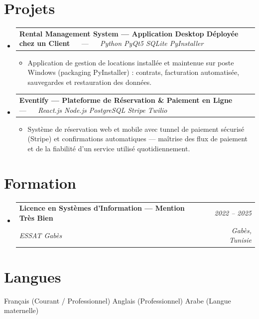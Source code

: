 \documentclass[letterpaper,9pt]{article}
\makeatletter
\newcommand{\resumeItem}[1]{\item\small{#1}}
\newcommand{\resumeSubheading}[4]{
  \vspace{-1pt}\item
  \begin{tabular*}{0.97\textwidth}[t]{l@{\extracolsep{\fill}}r}
    \textbf{#1} & \textit{\color{greytext}#2} \\
    \textit{\small\color{greytext} #3} & \textit{\small\color{greytext} #4}
  \end{tabular*}\vspace{-2pt}
}
\newcommand{\resumeProjectHeading}[2]{
  \item
  \begin{tabular*}{0.97\textwidth}{l@{\extracolsep{\fill}}r}
    \small #1 & #2
  \end{tabular*}\vspace{-1pt}
}
\newcommand{\resumeSubHeadingListStart}{\begin{itemize}[leftmargin=0.18in, label={}, itemsep=1.2pt, topsep=2.5pt, parsep=0pt]}
\newcommand{\resumeSubHeadingListEnd}{\end{itemize}\vspace{-2pt}}
\newcommand{\resumeProjectListStart}{\begin{itemize}[leftmargin=0.24in, label={}, itemsep=0.9pt, topsep=1.2pt, parsep=0pt]}
\newcommand{\resumeProjectListEnd}{\end{itemize}\vspace{-2pt}}
\makeatother
\begin{document}
\section{Projets}
\resumeSubHeadingListStart

  \resumeProjectHeading{\textbf{Rental Management System --- Application Desktop Déployée chez un Client} $\quad$ --- $\quad$ \emph{\color{greytext}Python \textperiodcentered{} PyQt5 \textperiodcentered{} SQLite \textperiodcentered{} PyInstaller}}{}
    \resumeProjectListStart
      \resumeItem{Application de gestion de locations installée et maintenue sur poste Windows (packaging PyInstaller) : contrats, facturation automatisée, sauvegardes et restauration des données.}
    \resumeProjectListEnd

  \resumeProjectHeading{\textbf{Eventify --- Plateforme de Réservation \& Paiement en Ligne} $\quad$ --- $\quad$ \emph{\color{greytext}React.js \textperiodcentered{} Node.js \textperiodcentered{} PostgreSQL \textperiodcentered{} Stripe \textperiodcentered{} Twilio}}{}
    \resumeProjectListStart
      \resumeItem{Système de réservation web et mobile avec tunnel de paiement sécurisé (Stripe) et confirmations automatiques — maîtrise des flux de paiement et de la fiabilité d'un service utilisé quotidiennement.}
    \resumeProjectListEnd

\resumeSubHeadingListEnd\vspace{-3pt}

\section{Formation}
\resumeSubHeadingListStart
  \resumeSubheading{Licence en Systèmes d'Information --- Mention Très Bien}{2022 -- 2025}{ESSAT Gabès}{Gabès, Tunisie}
\resumeSubHeadingListEnd\vspace{-1pt}

\section{Langues}
\begin{itemize}[leftmargin=0.18in, label={}, topsep=2pt, itemsep=1pt, parsep=0pt]
\footnotesize{
  \item Français (Courant / Professionnel) \textperiodcentered{} Anglais (Professionnel) \textperiodcentered{} Arabe (Langue maternelle)
}
\end{itemize}
\end{document}

